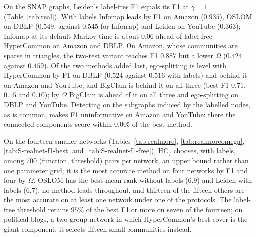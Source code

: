 On the SNAP graphs, Leiden's label-free F1 equals its F1 at $\gamma=1$
(Table~\ref{tab:real}). With labels Infomap leads by F1 on Amazon ($0.935$), OSLOM on
DBLP ($0.549$, against $0.545$ for Infomap) and Leiden on YouTube ($0.363$); Infomap at
its default Markov time is about $0.06$ ahead of label-free HyperCommon on Amazon and
DBLP. On Amazon, whose communities are sparse in triangles, the two-test variant reaches
F1 $0.887$ but a lower $\Omega$ ($0.424$ against $0.459$). Of the two methods added last,
ego-splitting is level with HyperCommon by F1 on DBLP ($0.524$ against $0.516$ with labels)
and behind it on Amazon and YouTube, and BigClam is behind it on all three (best F1
$0.71$, $0.15$ and $0.10$); by $\Omega$ BigClam is ahead of it on all three and
ego-splitting on DBLP and YouTube. Detecting on the subgraphs
induced by the labelled nodes, as is common, makes F1 uninformative on Amazon and
YouTube: there the connected components score within $0.005$ of the best method.

On the fourteen smaller networks (Tables~\ref{tab:realmore}, \ref{tab:realmoreomega},
\ref{tab:S-realnet-f1-best} and~\ref{tab:S-realnet-f1-free}), HC$_f$ chooses, with
labels, among 700 (function, threshold) pairs per network, an upper bound rather than one
parameter grid; it is the most accurate method on four networks by F1 and four by
$\Omega$. OSLOM has the best mean rank without labels ($6.9$) and Leiden with labels
($6.7$); no method leads throughout, and thirteen of the fifteen others are the most
accurate on at least one network under one of the protocols. The label-free threshold retains $95\%$ of the best F1 or more on seven of the
fourteen; on political blogs, a two-group network in which HyperCommon's best cover is the
giant component, it selects fifteen small communities instead.
